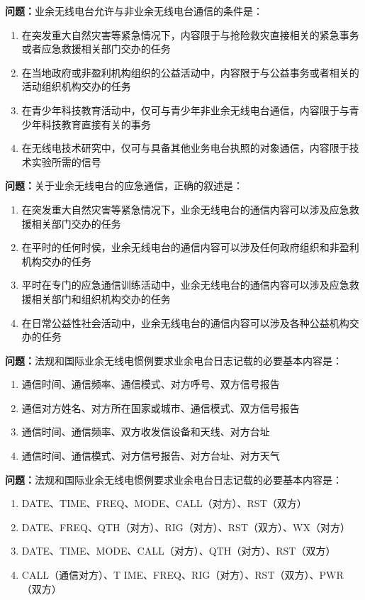 \bigskip


\noindent\textbf{问题：}业余无线电台允许与非业余无线电台通信的条件是：
\begin{enumerate}[label=\Alph*), leftmargin=3em]
\item 在突发重大自然灾害等紧急情况下，内容限于与抢险救灾直接相关的紧急事务或者应急救援相关部门交办的任务
\item 在当地政府或非盈利机构组织的公益活动中，内容限于与公益事务或者相关的活动组织机构交办的任务
\item 在青少年科技教育活动中，仅可与青少年非业余无线电台通信，内容限于与青少年科技教育直接有关的事务
\item 在无线电技术研究中，仅可与具备其他业务电台执照的对象通信，内容限于技术实验所需的信号
\end{enumerate}

\bigskip


\noindent\textbf{问题：}关于业余无线电台的应急通信，正确的叙述是：
\begin{enumerate}[label=\Alph*), leftmargin=3em]
\item 在突发重大自然灾害等紧急情况下，业余无线电台的通信内容可以涉及应急救援相关部门交办的任务
\item 在平时的任何时侯，业余无线电台的通信内容可以涉及任何政府组织和非盈利机构交办的任务
\item 平时在专门的应急通信训练活动中，业余无线电台的通信内容可以涉及应急救援相关部门和组织机构交办的任务
\item 在日常公益性社会活动中，业余无线电台的通信内容可以涉及各种公益机构交办的任务
\end{enumerate}

\bigskip


\noindent\textbf{问题：}法规和国际业余无线电惯例要求业余电台日志记载的必要基本内容是：
\begin{enumerate}[label=\Alph*), leftmargin=3em]
\item 通信时间、通信频率、通信模式、对方呼号、双方信号报告
\item 通信对方姓名、对方所在国家或城市、通信模式、双方信号报告
\item 通信时间、通信频率、双方收发信设备和天线、对方台址
\item 通信时间、通信模式、对方信号报告、对方台址、对方天气
\end{enumerate}

\bigskip


\noindent\textbf{问题：}法规和国际业余无线电惯例要求业余电台日志记载的必要基本内容是：
\begin{enumerate}[label=\Alph*), leftmargin=3em]
\item DATE、TIME、FREQ、MODE、CALL（对方）、RST（双方）
\item DATE、FREQ、QTH（对方）、RIG（对方）、RST（双方）、WX（对方）
\item DATE、TIME、MODE、CALL（对方）、QTH（对方）、RST（双方）
\item CALL（通信对方）、T IME、FREQ、RIG（对方）、RST（双方）、PWR（双方）
\end{enumerate}

